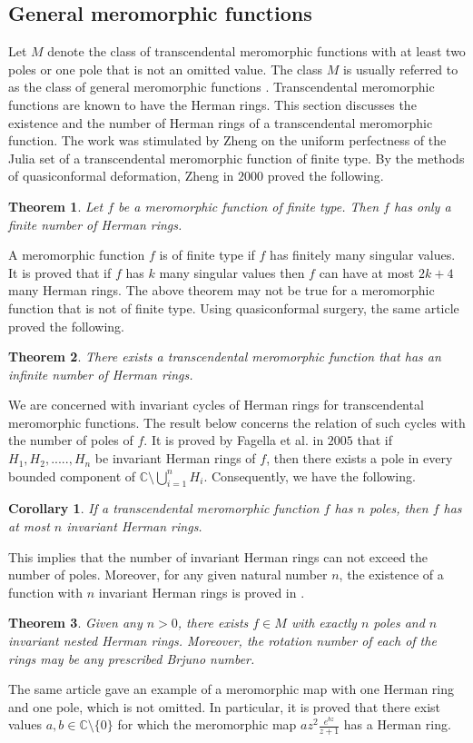 \documentclass[12pt]{article}
\newtheorem{theorem}{Theorem}[section]
\newtheorem{cor}{Corollary}[section]
\begin{document}
\subsection{ General meromorphic functions}
Let $M$ denote the class of transcendental meromorphic functions with at least two poles or one pole that is not an omitted value. The class $M$ is usually referred to as the class of general meromorphic functions \cite{berg93}.
Transcendental meromorphic functions are known to have the Herman rings. This section discusses the existence and the number of Herman rings of a transcendental meromorphic function.  The work was stimulated by Zheng on the uniform perfectness of the Julia set of a transcendental meromorphic function of finite type. By the methods of quasiconformal deformation,  Zheng \cite{zh} in $2000$ proved the following.
\begin{theorem}
	Let $f$ be a meromorphic function of finite type. Then $f$ has only a finite number of Herman rings. 
\end{theorem}
A meromorphic function $f$  is of finite type if $f$ has finitely many singular values. It is proved that if $f$ has $k$ many singular values then $f$ can have at most $2k+4$ many Herman rings. The above theorem may not be true for a meromorphic function that is not of finite type. Using quasiconformal surgery, the same article proved the following.
\begin{theorem}
	There exists a transcendental meromorphic function that has an infinite number of Herman rings.
\end{theorem}

  We are concerned with invariant cycles of Herman rings for transcendental meromorphic functions. The  result below concerns the relation of such cycles with the number of poles of $f$. It is proved by Fagella et al. \cite{nj} in $2005$ that if $H_1, H_2,....., H_n$ be invariant Herman rings of $f$, then there exists a pole in every bounded component of $\mathbb{C}\setminus \bigcup_{i=1}^{n} H_i$. Consequently, we have the following.
%	
\begin{cor}
	If a transcendental meromorphic function $f$ has $n$ poles, then $f$ has at most $n$ invariant Herman rings.
\end{cor}
This implies that the number of invariant Herman rings can not exceed the number of poles. Moreover, for any given natural number $n$, the existence of a function with $n$ invariant Herman rings is proved in \cite{pdnf}.
\begin{theorem}
	Given any $n>0$, there exists $f\in M$ with exactly $n$ poles and $n$ invariant nested Herman rings. Moreover, the rotation number of each of the rings may be any prescribed Brjuno number. 
\end{theorem}
The same article gave an example of a meromorphic map with one Herman ring and one pole, which is not omitted. In particular, it is proved that there exist values $a,b\in \mathbb{C}\setminus \{0\}$ for which the meromorphic map $az^2 \frac{e^{bz}}{z+1}$ has a Herman ring.
\end{document}
